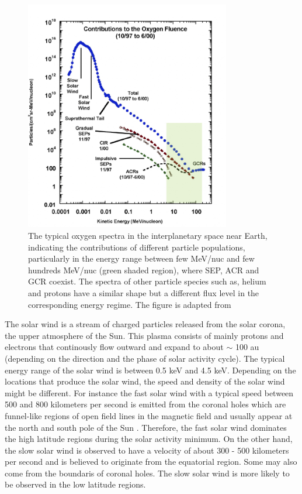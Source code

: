 \begin{figure}[!htb]
	\centering
	\includegraphics[width = 0.8\textwidth]{images/heliospheric_particle_spectra_color.png}
	\caption[Energy spectra of oxygen ions in near-Earth space]{The typical oxygen spectra in the interplanetary space near Earth, indicating the contributions of different particle populations, particularly in the energy range between few MeV/nuc and few hundreds MeV/nuc (green shaded region), where \acs{SEP}, \acs{ACR} and \acs{GCR} coexist. The spectra of other particle species such as, helium and protons have a similar shape but a different flux level in the corresponding energy regime. The figure is adapted from \citet{Mewaldt-2001}}
	\label{Fig:Oxygen_spectra_heliosphere}
\end{figure}


The solar wind is a stream of charged particles released from the solar corona, the upper atmosphere of the Sun. This plasma consists of mainly protons and electrons that continously flow outward and expand to about $\sim$ 100 au (depending on the direction and the phase of solar activity cycle). The typical energy range of the solar wind is between 0.5 keV and 4.5 keV. Depending on the locations that produce the solar wind, the speed and density of the solar wind might be different. For instance the fast solar wind with a typical speed between 500 and 800 kilometers per second is emitted from the coronal holes which are funnel-like regions of open field lines in the magnetic field and usually appear at the north and south pole of the Sun \citep{Sakao2007, Tu2005, hundhausen1968state}. Therefore, the fast solar wind dominates the high latitude regions during the solar activity minimum. On the other hand, the slow solar wind is observed to have a velocity of about 300 - 500 kilometers per second and is believed to originate from the equatorial region. Some may also come from the boundaris of coronal holes. The slow solar wind is more likely to be observed in the low latitude regions.


